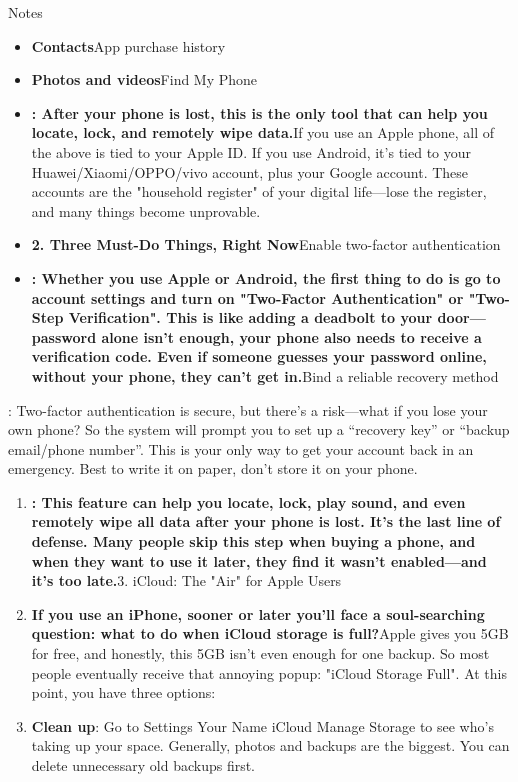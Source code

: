 


Notes

\begin{itemize}
  \item \textbf{Contacts}App purchase history
  \item \textbf{Photos and videos}Find My Phone
  \item \textbf{: After your phone is lost, this is the only tool that can help you locate, lock, and remotely wipe data.}If you use an Apple phone, all of the above is tied to your Apple ID. If you use Android, it's tied to your Huawei/Xiaomi/OPPO/vivo account, plus your Google account. These accounts are the "household register" of your digital life—lose the register, and many things become unprovable.
  \item \textbf{2. Three Must-Do Things, Right Now}Enable two-factor authentication
  \item \textbf{: Whether you use Apple or Android, the first thing to do is go to account settings and turn on "Two-Factor Authentication" or "Two-Step Verification". This is like adding a deadbolt to your door—password alone isn't enough, your phone also needs to receive a verification code. Even if someone guesses your password online, without your phone, they can't get in.}Bind a reliable recovery method
\end{itemize}

: Two-factor authentication is secure, but there's a risk—what if you lose your own phone? So the system will prompt you to set up a “recovery key” or “backup email/phone number”. This is your only way to get your account back in an emergency. Best to write it on paper, don't store it on your phone.


\begin{enumerate}
  \item \textbf{: This feature can help you locate, lock, play sound, and even remotely wipe all data after your phone is lost. It's the last line of defense. Many people skip this step when buying a phone, and when they want to use it later, they find it wasn't enabled—and it's too late.}3. iCloud: The "Air" for Apple Users
  \item \textbf{If you use an iPhone, sooner or later you'll face a soul-searching question: what to do when iCloud storage is full?}Apple gives you 5GB for free, and honestly, this 5GB isn't even enough for one backup. So most people eventually receive that annoying popup: "iCloud Storage Full". At this point, you have three options:
  \item \textbf{Clean up}: Go to Settings Your Name iCloud Manage Storage to see who's taking up your space. Generally, photos and backups are the biggest. You can delete unnecessary old backups first.
\end{enumerate}

